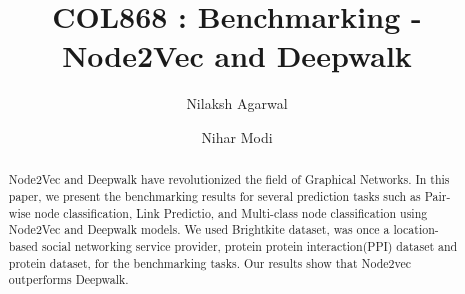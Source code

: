 \documentclass[sigconf]{acmart}
\begin{document}
\title{COL868 : Benchmarking - Node2Vec and Deepwalk}

\author{Nilaksh Agarwal}

\author{Nihar Modi}




\renewcommand{\shortauthors}{Agarwal and Modi}

\begin{abstract}
  Node2Vec and Deepwalk have revolutionized the field of Graphical Networks. In this paper, we present the benchmarking results for several prediction tasks such as Pair-wise node classification, Link Predictio, and Multi-class node classification using Node2Vec and Deepwalk models. We used Brightkite dataset, was once a location-based social networking service provider, protein protein interaction(PPI) dataset and protein dataset, for the benchmarking tasks. Our results show that Node2vec outperforms Deepwalk. 
\end{abstract}

\maketitle
{}%
\end{document}
